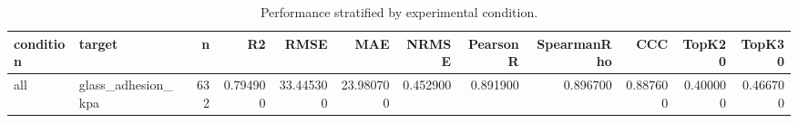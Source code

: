 \begin{table}
\caption{Performance stratified by experimental condition.}
\label{tab:condition_performance}
\begin{tabular}{llrrrrrrrrrr}
\toprule
condition & target & n & R2 & RMSE & MAE & NRMSE & PearsonR & SpearmanRho & CCC & TopK20 & TopK30 \\
\midrule
all & glass\_adhesion\_kpa & 632 & 0.794900 & 33.445300 & 23.980700 & 0.452900 & 0.891900 & 0.896700 & 0.887600 & 0.400000 & 0.466700 \\
\bottomrule
\end{tabular}
\end{table}
